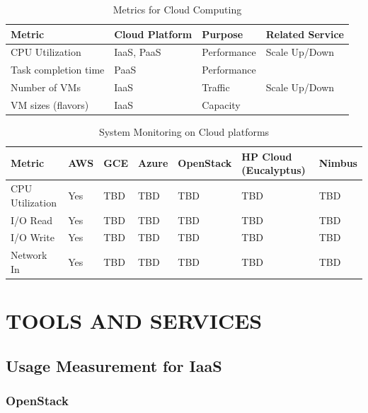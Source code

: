 \documentclass{sig-alternate-05-2015}
\begin{document}
\begin{table}[htb]
\caption{Metrics for Cloud Computing}
\label{T:NMmetrics}
\bigskip
\begin{tabular}{p{}p{}p{}p{}}
Metric & Cloud Platform & Purpose & Related Service \\
\hline
CPU Utilization &
IaaS, PaaS &
Performance &
Scale Up/Down \\
\hline
Task completion time &
PaaS &
Performance &
\\
\hline
Number of VMs &
IaaS &
Traffic &
Scale Up/Down \\
\hline
VM sizes (flavors) &
IaaS &
Capacity &
\\
\hline
\end{tabular}
\end{table}
\cite{aceto2013cloud}

\begin{table}[htb]
\caption{System Monitoring on Cloud platforms}
\label{T:SMmetrics}
\bigskip
\begin{tabular}{p{}p{}p{}p{}p{}p{}p{}}
Metric & AWS & GCE & Azure & OpenStack & HP Cloud (Eucalyptus) & Nimbus \\
\hline
CPU Utilization & Yes & TBD & TBD & TBD & TBD & TBD \\
\hline
I/O Read & Yes & TBD & TBD & TBD & TBD & TBD \\
\hline
I/O Write & Yes & TBD & TBD & TBD & TBD & TBD \\
\hline
Network In & Yes & TBD & TBD & TBD & TBD & TBD \\
\hline
\end{tabular}
\end{table}

\section{TOOLS AND SERVICES}

\subsection{Usage Measurement for IaaS}

\subsubsection{OpenStack}
\end{document}
